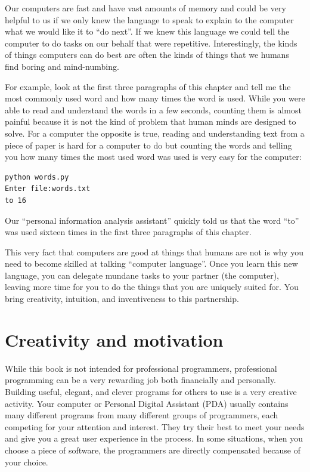 \documentclass[11pt]{book}
\begin{document}
Our computers are fast and have vast amounts of memory and 
could be very helpful to us if we only knew the language to
speak to explain to the computer what we would like it to 
``do next''.  If we knew this language we could tell the 
computer to do tasks on our behalf that were repetitive.  
Interestingly, the kinds of things computers can do best
are often the kinds of things that we humans find boring
and mind-numbing.

For example, look at the first three paragraphs of this
chapter and tell me the most commonly used word and how
many times the word is used.  While you were able to read
and understand the words in a few seconds, counting them
is almost painful because it is not the kind of problem 
that human minds are designed to solve.  For a computer
the opposite is true, reading and understanding text 
from a piece of paper is hard for a computer to do 
but counting the words and telling you how many times
the most used word was used is very easy for the
computer:

\beforeverb
\begin{verbatim}
python words.py
Enter file:words.txt
to 16
\end{verbatim}
\afterverb
%
Our ``personal information analysis assistant'' quickly 
told us that the word ``to'' was used sixteen times in the
first three paragraphs of this chapter.

This very fact that computers are good at things 
that humans are not is why you need to become
skilled at talking ``computer language''.  Once you learn
this new language, you can delegate mundane tasks
to your partner (the computer), leaving more time 
for you to do the 
things that you are uniquely suited for.  You bring 
creativity, intuition, and inventiveness to this
partnership.  

\section{Creativity and motivation}

While this book is not intended for professional programmers, professional
programming can be a very rewarding job both financially and personally.
Building useful, elegant, and clever programs for others to use is a very
creative activity.  Your computer or Personal Digital Assistant (PDA) 
usually contains many different programs from many different groups of 
programmers, each competing for your attention and interest.  They try 
their best to meet your needs and give you a great user experience in the
process.   In some situations, when you choose a piece of software, the 
programmers are directly compensated because of your choice.
\end{document}
